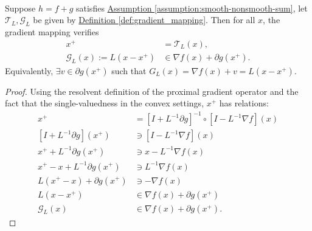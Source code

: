 \documentclass[12pt]{article}
\begin{document}
    \begin{lemma}
    \label{lemma:grad-map-approx-subgrad}\; \\
        Suppose $h = f + g$ satisfies 
        \hyperref[assumption:smooth-nonsmooth-sum]{Assumption \ref{assumption:smooth-nonsmooth-sum}}, 
        let $\mathcal T_L, \mathcal G_L$ be given by 
        \hyperref[def:gradient_mapping]{Definition \ref*{def:gradient_mapping}}.
        Then for all $x$, the gradient mapping verifies
        \begin{align*}
            x^+ &= \mathcal T_L(x), 
            \\
            \mathcal G_L(x) := L(x - x^+) &\in  \nabla f(x) + \partial g(x^+). 
        \end{align*}
        Equivalently, $\exists v \in \partial g(x^+)$ such that $G_L(x) = \nabla f(x) + v = L(x - x^+)$. 
    \end{lemma}
    \begin{proof}
        Using the resolvent definition of the proximal gradient operator and the fact that the single-valuedness in the convex settings, $x^+$ has relations: 
        \begin{align*}
            x^+ &= [I + L^{-1}\partial g]^{-1}\circ [I - L^{-1}\nabla f](x)
            \\
            [I + L^{-1}\partial g](x^+) &\ni [I - L^{-1}\nabla f](x)
            \\
            x^+ + L^{-1}\partial g(x^+) &\ni x - L^{-1}\nabla f(x)
            \\
            x^+ - x + L^{-1}\partial g(x^+) &\ni L^{-1}\nabla f(x)
            \\
            L(x^+ - x) + \partial g(x^+) &\ni - \nabla f(x)
            \\
            L(x - x^+) &\in \nabla f(x) + \partial g(x^+)
            \\
            \mathcal G_L(x) &\in \nabla f(x) + \partial g(x^+). 
        \end{align*}
    \end{proof}
\end{document}
